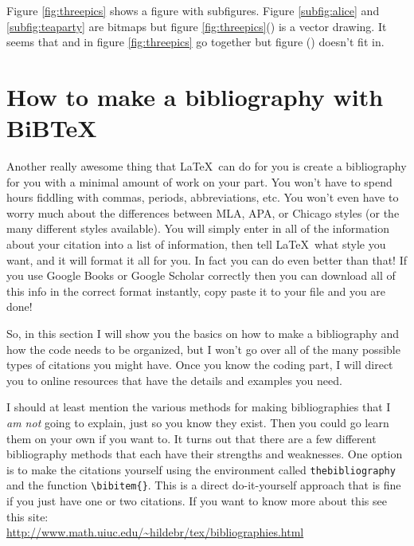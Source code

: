 \documentclass{article}
\newcommand{\nid}{\noindent} %
\begin{document}
Figure \ref{fig:threepics} shows a figure with subfigures.  Figure \ref{subfig:alice} and \eqref{subfig:teaparty} are bitmaps but figure \ref{fig:threepics}() is a vector drawing.  It seems that  and  in figure \eqref{fig:threepics} go together but figure () doesn't fit in.


%
%
%
%
\section{How to make a bibliography with BiB\TeX}\label{sec:bibtex}
Another really awesome thing that \LaTeX\ can do for you is create a bibliography for you with a minimal amount of work on your part.  You won't have to spend hours fiddling with commas, periods, abbreviations, etc.  You won't even have to worry much about the differences between MLA, APA, or Chicago styles (or the many different styles available).  You will simply enter in all of the information about your citation into a list of information, then tell \LaTeX\ what style you want, and it will format it all for you.  In fact you can do even better than that! If you use Google Books or Google Scholar correctly then you can download all of this info in the correct format instantly, copy paste it to your file and you are done! 

So, in this section I will show you the basics on how to make a bibliography and how the code needs to be organized, but I won't go over all of the many possible types of citations you might have.  Once you know the coding part, I will direct you to online resources that have the details and examples you need.

I should at least mention the various methods for making bibliographies that I \emph{am not} going to explain, just so you know they exist.  Then you could go learn them on your own if you want to.  It turns out that there are a few different bibliography methods that each have their strengths and weaknesses.  One option is to make the citations yourself using the environment called \texttt{thebibliography} and the function \verb|\bibitem{}|.  This is a direct do-it-yourself approach that is fine if you just have one or two citations.  If you want to know more about this see this site:\\

\nid\url{http://www.math.uiuc.edu/~hildebr/tex/bibliographies.html}\\
\end{document}
